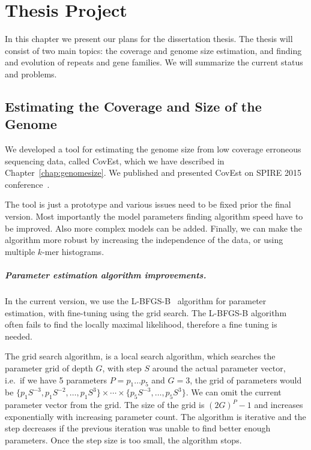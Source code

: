 \chapter{Thesis Project}

In this chapter we present our plans for the dissertation thesis. The thesis will consist of two main topics:
the coverage and genome size estimation, and finding and evolution of repeats and gene families.
We will summarize the current status and problems.

\section{Estimating the Coverage and Size of the Genome}

We developed a tool for estimating the genome size from low coverage erroneous sequencing data, called CovEst, which we have described in Chapter~\ref{chap:genomesize}. We published and presented CovEst on SPIRE 2015 conference~\cite{covest}.

The tool is just a prototype and various issues need to be fixed prior the final version. Most importantly the model parameters finding algorithm speed have to be improved. Also more complex models can be added. Finally, we can make the algorithm more robust by increasing the independence of the data, or using multiple $k$-mer histograms.

\paragraph{Parameter estimation algorithm improvements.}
In the current version, we use the L-BFGS-B~\cite{l-bfgs-b} algorithm for parameter estimation, with fine-tuning using the grid search.
The L-BFGS-B algorithm often fails to find the locally maximal likelihood, therefore a fine tuning is needed.

The grid search algorithm, is a local search algorithm, which searches the parameter grid of depth $G$, with step $S$ around the actual parameter vector, i.e.\ if we have 5 parameters $P = p_1\dots p_5$ and $G = 3$, the grid of parameters would be $\{p_1 S^{-3}, p_1 S^{-2}, \dots, p_1 S^3\} \times \cdots \times \{p_5 S^{-3}, \dots, p_5 S^3\}$. We can omit the current parameter vector from the grid. The size of the grid is ${(2G)}^P - 1$ and increases exponentially with increasing parameter count. The algorithm is iterative and the step decreases if the previous iteration was unable to find better enough parameters. Once the step size is too small, the algorithm stops.


